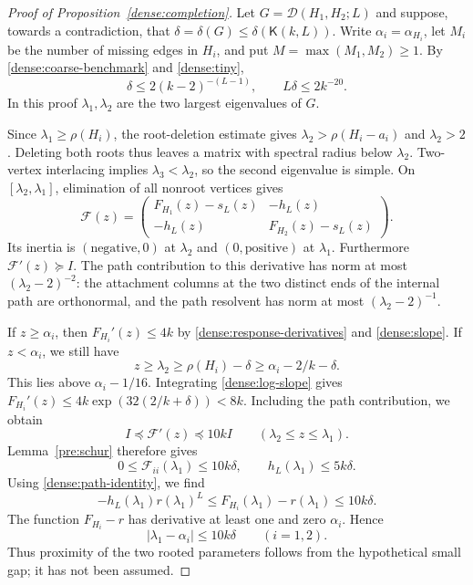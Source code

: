 \documentclass[11pt,a4paper]{article}
\numberwithin{equation}{section}
\theoremstyle{definition}
\theoremstyle{remark}
\newcommand{\Kite}{\mathsf{K}}
\begin{document}
\begin{proof}[Proof of Proposition~\ref{dense:completion}]
Let $G=\mathcal D(H_1,H_2;L)$ and suppose, towards a contradiction,
that $\delta=\delta(G)\le\delta(\Kite(k,L))$.
Write $\alpha_i=\alpha_{H_i}$, let $M_i$ be the number of missing
edges in $H_i$, and put $M=\max(M_1,M_2)\ge1$.
By \eqref{dense:coarse-benchmark} and \eqref{dense:tiny},
\begin{equation}\label{dense:small-gap}
 \delta\le2(k-2)^{-(L-1)},
 \qquad L\delta\le2k^{-20}.
\end{equation}
In this proof $\lambda_1,\lambda_2$ are the two largest eigenvalues
of $G$.

Since $\lambda_1\ge\rho(H_i)$, the root-deletion estimate gives
$\lambda_2>\rho(H_i-a_i)$ and $\lambda_2>2$.
Deleting both roots thus leaves a matrix with spectral radius below
$\lambda_2$.  Two-vertex interlacing implies
$\lambda_3<\lambda_2$, so the second eigenvalue is simple.
On $[\lambda_2,\lambda_1]$, elimination of all nonroot vertices gives
\begin{equation}\label{dense:schur}
 \mathcal F(z)=
 \begin{pmatrix}
 F_{H_1}(z)-s_L(z)&-h_L(z)\\
 -h_L(z)&F_{H_2}(z)-s_L(z)
 \end{pmatrix}.
\end{equation}
Its inertia is $(\text{negative},0)$ at $\lambda_2$ and
$(0,\text{positive})$ at $\lambda_1$.
Furthermore $\mathcal F'(z)\succeq I$.
The path contribution to this derivative has norm at most
$(\lambda_2-2)^{-2}$: the attachment columns at the two distinct
ends of the internal path are orthonormal, and the path resolvent
has norm at most $(\lambda_2-2)^{-1}$.

If $z\ge\alpha_i$, then $F_{H_i}'(z)\le4k$ by
\eqref{dense:response-derivatives} and \eqref{dense:slope}.
If $z<\alpha_i$, we still have
\[
 z\ge\lambda_2\ge\rho(H_i)-\delta
   \ge\alpha_i-2/k-\delta.
\]
This lies above $\alpha_i-1/16$.
Integrating \eqref{dense:log-slope} gives
$F_{H_i}'(z)\le4k\exp(32(2/k+\delta))<8k$.
Including the path contribution, we obtain
\begin{equation}\label{dense:rough-matrix-slope}
 I\preceq\mathcal F'(z)\preceq10kI
 \qquad(\lambda_2\le z\le\lambda_1).
\end{equation}
Lemma~\ref{pre:schur} therefore gives
\[
 0\le\mathcal F_{ii}(\lambda_1)\le10k\delta,
 \qquad h_L(\lambda_1)\le5k\delta.
\]
Using \eqref{dense:path-identity}, we find
\[
 -h_L(\lambda_1)r(\lambda_1)^L
 \le F_{H_i}(\lambda_1)-r(\lambda_1)\le10k\delta.
\]
The function $F_{H_i}-r$ has derivative at least one and zero
$\alpha_i$.  Hence
\begin{equation}\label{dense:resonance}
 |\lambda_1-\alpha_i|\le10k\delta\qquad(i=1,2).
\end{equation}
Thus proximity of the two rooted parameters follows from the
hypothetical small gap; it has not been assumed.


\end{proof}
\end{document}

